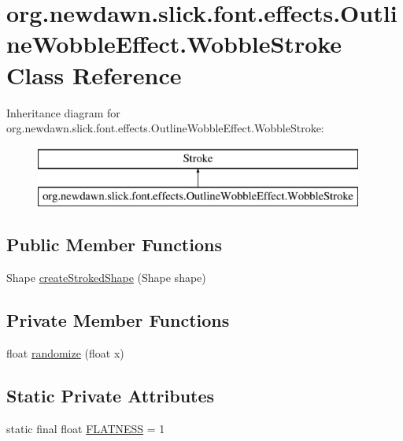 \hypertarget{classorg_1_1newdawn_1_1slick_1_1font_1_1effects_1_1_outline_wobble_effect_1_1_wobble_stroke}{}\section{org.\+newdawn.\+slick.\+font.\+effects.\+Outline\+Wobble\+Effect.\+Wobble\+Stroke Class Reference}
\label{classorg_1_1newdawn_1_1slick_1_1font_1_1effects_1_1_outline_wobble_effect_1_1_wobble_stroke}
Inheritance diagram for org.\+newdawn.\+slick.\+font.\+effects.\+Outline\+Wobble\+Effect.\+Wobble\+Stroke\+:\begin{figure}[H]
\begin{center}
\leavevmode
\includegraphics[height=2.000000cm]{classorg_1_1newdawn_1_1slick_1_1font_1_1effects_1_1_outline_wobble_effect_1_1_wobble_stroke}
\end{center}
\end{figure}
\subsection*{Public Member Functions}
\begin{DoxyCompactItemize}
\item 
Shape \mbox{\hyperlink{classorg_1_1newdawn_1_1slick_1_1font_1_1effects_1_1_outline_wobble_effect_1_1_wobble_stroke_a1f409e24e06e974e42cf454f3763814a}{create\+Stroked\+Shape}} (Shape shape)
\end{DoxyCompactItemize}
\subsection*{Private Member Functions}
\begin{DoxyCompactItemize}
\item 
float \mbox{\hyperlink{classorg_1_1newdawn_1_1slick_1_1font_1_1effects_1_1_outline_wobble_effect_1_1_wobble_stroke_a6aa4ed3188495bd4abcf9b2862615330}{randomize}} (float x)
\end{DoxyCompactItemize}
\subsection*{Static Private Attributes}
\begin{DoxyCompactItemize}
\item 
static final float \mbox{\hyperlink{classorg_1_1newdawn_1_1slick_1_1font_1_1effects_1_1_outline_wobble_effect_1_1_wobble_stroke_abb70d0bc0ea08d8be8f328ce24eaf8e5}{F\+L\+A\+T\+N\+E\+SS}} = 1
\end{DoxyCompactItemize}


